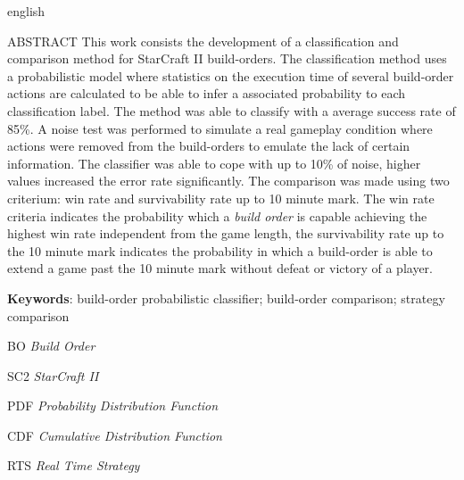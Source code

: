 \begin{resumo}[Abstract]
 \begin{otherlanguage*}{english}
	
	ABSTRACT
	This work consists the development of a classification and comparison method for StarCraft II \glspl{build-order}. The classification method uses a probabilistic model where statistics on the execution time of several \gls{build-order} actions are calculated to be able to infer a associated probability to each classification label. The method was able to classify with a average success rate of 85\%. A noise test was performed to simulate a real gameplay condition where actions were removed from the \glspl{build-order} to emulate the lack of certain information. The classifier was able to cope with up to 10\% of noise, higher values increased the error rate significantly. The comparison was made using two criterium: win rate and survivability rate up to 10 minute mark. The win rate criteria indicates the probability which a \textit{build order} is capable achieving the highest win rate independent from the game length, the survivability rate up to the 10 minute mark indicates the probability in which a \gls{build-order} is able to extend a game past the 10 minute mark without defeat or victory of a player.
		
	\vspace{\onelineskip}
	\noindent 
	\textbf{Keywords}: \gls{build-order} probabilistic classifier; \gls{build-order} comparison; strategy comparison
 \end{otherlanguage*}
\end{resumo}


\listoffigures*
\cleardoublepage

\listoftables*
\cleardoublepage

\begin{siglas}
	\item[BO]		\emph{Build Order}
	\item[SC2]		\emph{StarCraft II}
	\item[PDF]		\emph{Probability Distribution Function}
	\item[CDF]		\emph{Cumulative Distribution Function}
	\item[RTS]		\emph{Real Time Strategy}
\end{siglas}

